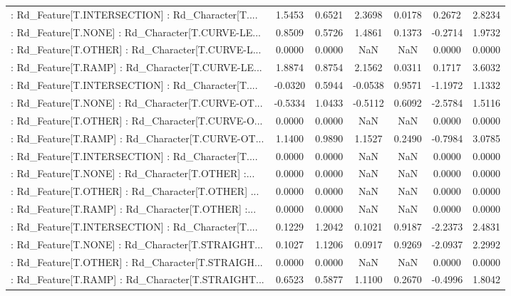 \begin{longtable}{p{4cm}cccccc}
 : Rd\_Feature[T.INTERSECTION] : Rd\_Character[T.... &  1.5453 &    0.6521 &  2.3698 &       0.0178 &  0.2672 &  2.8234 \\
 : Rd\_Feature[T.NONE] : Rd\_Character[T.CURVE-LE... &  0.8509 &    0.5726 &  1.4861 &       0.1373 & -0.2714 &  1.9732 \\
 : Rd\_Feature[T.OTHER] : Rd\_Character[T.CURVE-L... &  0.0000 &    0.0000 &     NaN &          NaN &  0.0000 &  0.0000 \\
 : Rd\_Feature[T.RAMP] : Rd\_Character[T.CURVE-LE... &  1.8874 &    0.8754 &  2.1562 &       0.0311 &  0.1717 &  3.6032 \\
 : Rd\_Feature[T.INTERSECTION] : Rd\_Character[T.... & -0.0320 &    0.5944 & -0.0538 &       0.9571 & -1.1972 &  1.1332 \\
 : Rd\_Feature[T.NONE] : Rd\_Character[T.CURVE-OT... & -0.5334 &    1.0433 & -0.5112 &       0.6092 & -2.5784 &  1.5116 \\
 : Rd\_Feature[T.OTHER] : Rd\_Character[T.CURVE-O... &  0.0000 &    0.0000 &     NaN &          NaN &  0.0000 &  0.0000 \\
 : Rd\_Feature[T.RAMP] : Rd\_Character[T.CURVE-OT... &  1.1400 &    0.9890 &  1.1527 &       0.2490 & -0.7984 &  3.0785 \\
 : Rd\_Feature[T.INTERSECTION] : Rd\_Character[T.... &  0.0000 &    0.0000 &     NaN &          NaN &  0.0000 &  0.0000 \\
 : Rd\_Feature[T.NONE] : Rd\_Character[T.OTHER] :... &  0.0000 &    0.0000 &     NaN &          NaN &  0.0000 &  0.0000 \\
 : Rd\_Feature[T.OTHER] : Rd\_Character[T.OTHER] ... &  0.0000 &    0.0000 &     NaN &          NaN &  0.0000 &  0.0000 \\
 : Rd\_Feature[T.RAMP] : Rd\_Character[T.OTHER] :... &  0.0000 &    0.0000 &     NaN &          NaN &  0.0000 &  0.0000 \\
 : Rd\_Feature[T.INTERSECTION] : Rd\_Character[T.... &  0.1229 &    1.2042 &  0.1021 &       0.9187 & -2.2373 &  2.4831 \\
 : Rd\_Feature[T.NONE] : Rd\_Character[T.STRAIGHT... &  0.1027 &    1.1206 &  0.0917 &       0.9269 & -2.0937 &  2.2992 \\
 : Rd\_Feature[T.OTHER] : Rd\_Character[T.STRAIGH... &  0.0000 &    0.0000 &     NaN &          NaN &  0.0000 &  0.0000 \\
 : Rd\_Feature[T.RAMP] : Rd\_Character[T.STRAIGHT... &  0.6523 &    0.5877 &  1.1100 &       0.2670 & -0.4996 &  1.8042 \\

\end{longtable}
